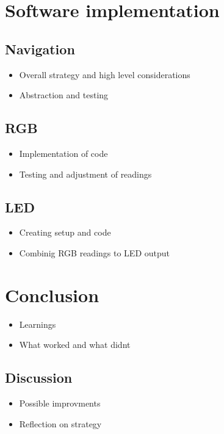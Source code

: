 \documentclass{article}
\begin{document}
    \section*{Software implementation}
        \subsection*{Navigation}
            \begin{itemize}
                \item Overall strategy and high level considerations
                \item Abstraction and testing
            \end{itemize}
        \subsection*{RGB}
            \begin{itemize}
                \item Implementation of code
                \item Testing and adjustment of readings
            \end{itemize}
        \subsection*{LED}
            \begin{itemize}
                \item Creating setup and code
                \item Combinig RGB readings to LED output
            \end{itemize}
    \section*{Conclusion}
    \begin{itemize}
        \item Learnings
        \item What worked and what didnt
    \end{itemize}
        \subsection*{Discussion}
            \begin{itemize}
                \item Possible improvments
                \item Reflection on strategy
            \end{itemize}
\end{document}
